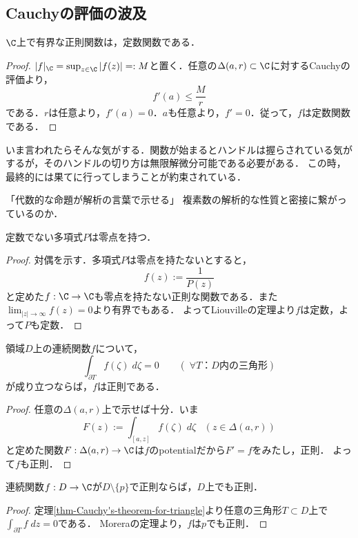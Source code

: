 \documentclass[uplatex, dvipdfmx]{jsreport}
\begin{document}
\subsection{Cauchyの評価の波及}

\begin{theorem}[Liouville]\label{thm-Liouville}
    $\C$上で有界な正則関数は，定数関数である．
\end{theorem}
\begin{proof}
    $|f|_\C=\sup_{z\in\C}|f(z)|=:M$と置く．任意の$\Delta(a,r)\subset\C$に対するCauchyの評価より，
    \[f'(a)\le\frac{M}{r}\]
    である．$r$は任意より，$f'(a)=0$．$a$も任意より，$f'=0$．従って，$f$は定数関数である．
\end{proof}
\begin{remarks}
    いま言われたらそんな気がする．関数が始まるとハンドルは握らされている気がするが，そのハンドルの切り方は無限解微分可能である必要がある．
    この時，最終的には果てに行ってしまうことが約束されている．
\end{remarks}

「代数的な命題が解析の言葉で示せる」
複素数の解析的な性質と密接に繋がっているのか．

\begin{theorem}
    定数でない多項式$P$は零点を持つ．
\end{theorem}
\begin{proof}
    対偶を示す．多項式$P$は零点を持たないとすると，
    \[ f(z):=\frac{1}{P(z)} \]
    と定めた$f:\C\to\C$も零点を持たない正則な関数である．また$\lim_{|z|\to\infty}f(z)=0$より有界でもある．
    よってLiouvilleの定理より$f$は定数，よって$P$も定数．
\end{proof}

\begin{theorem}[Morera]\label{thm-Morera}
    領域$D$上の連続関数$f$について，
    \[ \int_{\partial T}f(\zeta)\;d\zeta=0\qquad(\;\forall T：D内の三角形) \]
    が成り立つならば，$f$は正則である．
\end{theorem}
\begin{proof}
    任意の$\Delta(a,r)$上で示せば十分．いま
    \[ F(z):=\int_{[a,z]}f(\zeta)\;d\zeta\;\;\;(z\in\Delta(a,r)) \]
    と定めた関数$F:\Delta(a,r)\to\C$は$f$のpotentialだから$F'=f$をみたし，正則．
    よって$f$も正則．
\end{proof}

\begin{corollary}\label{cor-erasing-unknown-differentialability}
    連続関数$f:D\to\C$が$D\setminus\{p\}$で正則ならば，$D$上でも正則．
\end{corollary}
\begin{proof}
    定理\ref{thm-Cauchy's-theorem-for-triangle}より任意の三角形$T\subset D$上で$\int_{\partial T}f\;dz=0$である．
    Moreraの定理より，$f$は$p$でも正則．
\end{proof}
\end{document}
